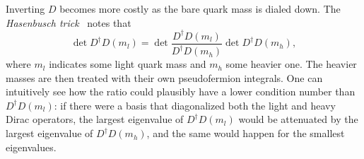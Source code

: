 Inverting $D$ becomes more costly as the bare quark mass is dialed down.
The {\it Hasenbusch trick}~\cite{hasenbusch_speeding_2001,urbach_hmc_2006}
notes that
\begin{equation}
\det D^{\dagger} D\left(m_l\right)=\det \frac{D^{\dagger}
D\left(m_l\right)}{D^{\dagger} D\left(m_h\right)} \det D^{\dagger}
D\left(m_h\right),
\end{equation}
where $m_l$ indicates some light quark mass and $m_h$ some heavier one.
The heavier masses are then treated with their own pseudofermion integrals.
One can intuitively see how the ratio could plausibly have a lower condition
number than $D^\dagger D(m_l)$: 
if there were a basis that diagonalized both the light and heavy Dirac
operators, the largest eigenvalue of $D^\dagger D(m_l)$ would be attenuated by
the largest eigenvalue of $D^\dagger D(m_h)$, and the same would happen for the
smallest eigenvalues.





